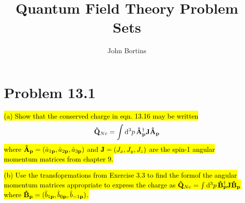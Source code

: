 \documentclass{article}
\title{Quantum Field Theory Problem Sets}
\author{John Bortins}
\begin{document}
\maketitle{}


\section*{Problem 13.1}
\begin{quoting}
  \hl{(a) Show that the conserved charge in eqn. 13.16 may be written}
  \[\vb{\hat{Q}}_{Nc}=\int\dd[3]{p}\vb{\hat{A}}^\dagger_{\vb{p}}\vb{J}\vb{\hat{A}}_{\vb{p}} \]
  \hl{where  $\vb{\hat{A}}_{\vb{p}}=(\hat{a}_{1\vb{p}},\hat{a}_{2\vb{p}},\hat{a}_{3\vb{p}})$ and  $\vb{J}=(J_x,J_y,J_z)$ are the spin-1 angular momentum matrices from chapter 9.}

  \hl{(b) Use the transfoprmations from Exercise 3.3 to find the formof the angular momentum matrices appropriate to express the charge as  $\vb{\hat{Q}}_{Nc}=\int\dd[3]{p}\vb{\hat{B}}^\dagger_{\vb{p}}\vb{J}\vb{\hat{B}}_{\vb{p}}$ where $\vb{\hat{B}}_{\vb{p}}=(\hat{b}_{1\vb{p}},\hat{b}_{0\vb{p}},\hat{b}_{-1\vb{p}})$.}
\end{quoting}
\end{document}
